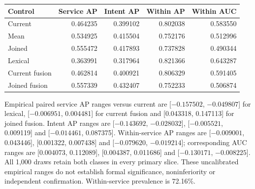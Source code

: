 \documentclass[11pt]{article}
\begin{document}
\begin{center}
\begin{tabular}{lrrrr}
\toprule
Control & Service AP & Intent AP & Within AP & Within AUC \\
\midrule
Current & 0.464235 & 0.399102 & 0.802038 & 0.583550 \\
Mean & 0.534925 & 0.415504 & 0.752176 & 0.512996 \\
Joined & 0.555472 & 0.417893 & 0.737828 & 0.490344 \\
Lexical & 0.363991 & 0.317964 & 0.821366 & 0.643287 \\
Current fusion & 0.462814 & 0.400921 & 0.806329 & 0.591405 \\
Joined fusion & 0.557339 & 0.432407 & 0.752233 & 0.506874 \\
\bottomrule
\end{tabular}
\end{center}
Empirical paired service AP ranges versus current are
[$-0.157502$, $-0.049807$] for lexical, [$-0.006951$, 0.004481] for current
fusion and [0.043318, 0.147113] for joined fusion. Intent AP ranges are
[$-0.143692$, $-0.028032$], [$-0.005521$, 0.009119] and
[$-0.014461$, 0.087375]. Within-service AP ranges are
[$-0.009001$, 0.043446], [0.001322, 0.007438] and
[$-0.079620$, $-0.019214$]; corresponding AUC ranges are
[0.004073, 0.112089], [0.004387, 0.011686] and
[$-0.130171$, $-0.008225$]. All 1,000 draws retain both classes in every primary
slice. These uncalibrated empirical ranges do not establish formal significance,
noninferiority or independent confirmation. Within-service prevalence is 72.16\%.
\end{document}
